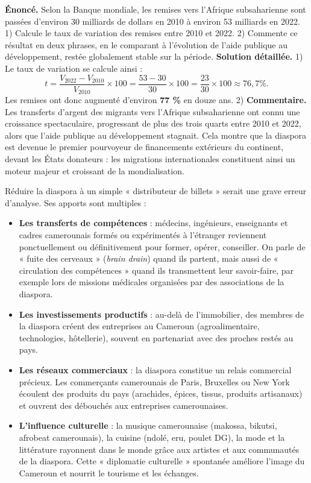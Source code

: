 \documentclass[11pt]{article}
\newcounter{popsec}
\newcounter{popsub}
\newcommand{\courssub}[1]{%
  \stepcounter{popsub}%
  \par\vspace{9pt}\noindent{\popxbold\fontsize{11.5}{13}\selectfont\color{popink}{\color{poporange}\thepopsec.\thepopsub}\hspace{6pt}#1}\par\nopagebreak\vspace{4pt}
}
\begin{document}
\begin{exoresolu}
\textbf{Énoncé.} Selon la Banque mondiale, les remises vers l'Afrique subsaharienne sont passées d'environ 30 milliards de dollars en 2010 à environ 53 milliards en 2022. 1) Calcule le taux de variation des remises entre 2010 et 2022. 2) Commente ce résultat en deux phrases, en le comparant à l'évolution de l'aide publique au développement, restée globalement stable sur la période.
\tcblower
\textbf{Solution détaillée.}
1) Le taux de variation se calcule ainsi :
\[ t = \frac{V_{2022} - V_{2010}}{V_{2010}} \times 100 = \frac{53 - 30}{30} \times 100 = \frac{23}{30} \times 100 \approx 76,7 \%. \]
Les remises ont donc augmenté d'environ \textbf{77 \%} en douze ans.
2) \textbf{Commentaire.} Les transferts d'argent des migrants vers l'Afrique subsaharienne ont connu une croissance spectaculaire, progressant de plus des trois quarts entre 2010 et 2022, alors que l'aide publique au développement stagnait. Cela montre que la diaspora est devenue le premier pourvoyeur de financements extérieurs du continent, devant les États donateurs : les migrations internationales constituent ainsi un moteur majeur et croissant de la mondialisation.
\end{exoresolu}

\courssub{Les autres apports de la diaspora}

Réduire la diaspora à un simple « distributeur de billets » serait une grave erreur d'analyse. Ses apports sont multiples :

\begin{itemize}
\item \textbf{Les transferts de compétences} : médecins, ingénieurs, enseignants et cadres camerounais formés ou expérimentés à l'étranger reviennent ponctuellement ou définitivement pour former, opérer, conseiller. On parle de « fuite des cerveaux » (\emph{brain drain}) quand ils partent, mais aussi de « circulation des compétences » quand ils transmettent leur savoir-faire, par exemple lors de missions médicales organisées par des associations de la diaspora.
\item \textbf{Les investissements productifs} : au-delà de l'immobilier, des membres de la diaspora créent des entreprises au Cameroun (agroalimentaire, technologies, hôtellerie), souvent en partenariat avec des proches restés au pays.
\item \textbf{Les réseaux commerciaux} : la diaspora constitue un relais commercial précieux. Les commerçants camerounais de Paris, Bruxelles ou New York écoulent des produits du pays (arachides, épices, tissus, produits artisanaux) et ouvrent des débouchés aux entreprises camerounaises.
\item \textbf{L'influence culturelle} : la musique camerounaise (makossa, bikutsi, afrobeat camerounais), la cuisine (ndolé, eru, poulet DG), la mode et la littérature rayonnent dans le monde grâce aux artistes et aux communautés de la diaspora. Cette « diplomatie culturelle » spontanée améliore l'image du Cameroun et nourrit le tourisme et les échanges.
\end{itemize}
\end{document}
